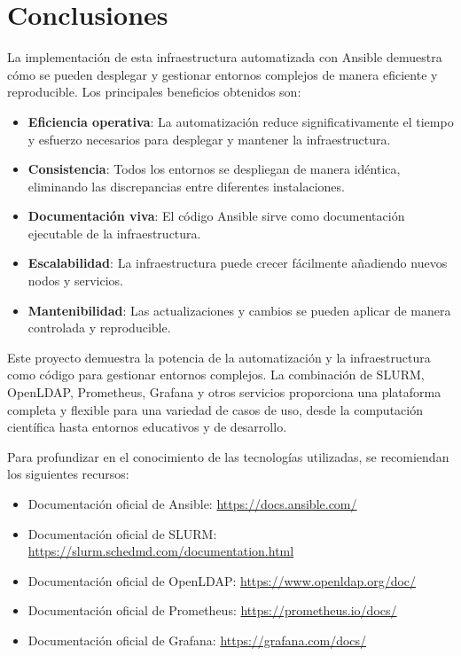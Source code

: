 \documentclass[12pt,a4paper]{article}
\begin{document}
\section{Conclusiones}
\newpage

La implementación de esta infraestructura automatizada con Ansible demuestra cómo se pueden desplegar y gestionar entornos complejos de manera eficiente y reproducible. Los principales beneficios obtenidos son:

\begin{itemize}[leftmargin=*]
    \item \textbf{Eficiencia operativa}: La automatización reduce significativamente el tiempo y esfuerzo necesarios para desplegar y mantener la infraestructura.
    \item \textbf{Consistencia}: Todos los entornos se despliegan de manera idéntica, eliminando las discrepancias entre diferentes instalaciones.
    \item \textbf{Documentación viva}: El código Ansible sirve como documentación ejecutable de la infraestructura.
    \item \textbf{Escalabilidad}: La infraestructura puede crecer fácilmente añadiendo nuevos nodos y servicios.
    \item \textbf{Mantenibilidad}: Las actualizaciones y cambios se pueden aplicar de manera controlada y reproducible.
\end{itemize}

Este proyecto demuestra la potencia de la automatización y la infraestructura como código para gestionar entornos complejos. La combinación de SLURM, OpenLDAP, Prometheus, Grafana y otros servicios proporciona una plataforma completa y flexible para una variedad de casos de uso, desde la computación científica hasta entornos educativos y de desarrollo.

\begin{infobox}
Para profundizar en el conocimiento de las tecnologías utilizadas, se recomiendan los siguientes recursos:
\begin{itemize}
    \item Documentación oficial de Ansible: \url{https://docs.ansible.com/}
    \item Documentación oficial de SLURM: \url{https://slurm.schedmd.com/documentation.html}
    \item Documentación oficial de OpenLDAP: \url{https://www.openldap.org/doc/}
    \item Documentación oficial de Prometheus: \url{https://prometheus.io/docs/}
    \item Documentación oficial de Grafana: \url{https://grafana.com/docs/}
\end{itemize}
\end{infobox}
\end{document}
